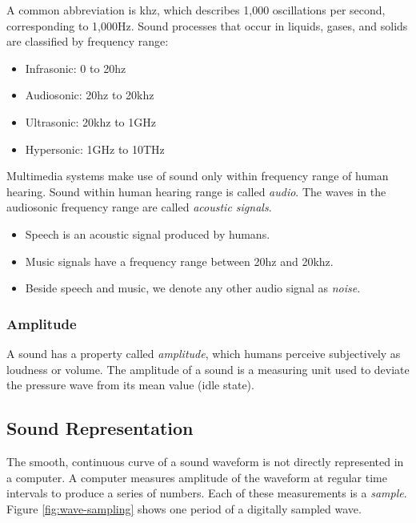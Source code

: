 A common abbreviation is \gls{khz}, which describes 1,000 oscillations per second, corresponding to 1,000Hz. Sound processes that occur in liquids, gases, and solids are classified by frequency range:

\begin{multicols}{2}
\begin{itemize}
	\item Infrasonic: 0 to 20\gls{hz}
	\item Audiosonic: 20\gls{hz} to 20\gls{khz}
	\item Ultrasonic: 20\gls{khz} to 1GHz
	\item Hypersonic: 1GHz to 10THz
\end{itemize}
\end{multicols}


 Multimedia systems make use of sound only within frequency range of human hearing. Sound within human hearing range is called \textit{audio}. The waves in the audiosonic frequency range are called \textit{acoustic signals}. 

\begin{itemize}
	\item Speech is an acoustic signal produced by humans.
	\item Music signals have a frequency range between 20\gls{hz} and 20\gls{khz}.
	\item Beside speech and music, we denote any other audio signal as \textit{noise}.
\end{itemize}


\subsubsection{Amplitude}
A sound has a property called \textit{amplitude}, which humans perceive subjectively as
loudness or volume. The amplitude of a sound is a measuring unit used to deviate the
pressure wave from its mean value (idle state).

\subsection[Representation]{Sound Representation}
The smooth, continuous curve of a sound waveform is not directly represented in
a computer. A computer measures amplitude of the waveform at regular time
intervals to produce a series of numbers. Each of these measurements is a \textit{sample}. Figure {\ref{fig:wave-sampling}} shows one period of a digitally sampled wave.

